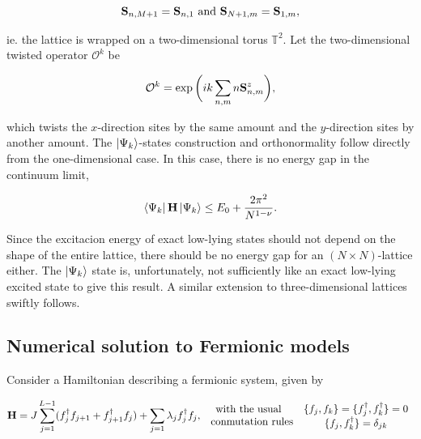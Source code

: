 \documentclass{homework}
\begin{document}
$$
{\bf S}_{n, M+1} = {\bf S}_{n, 1} \textnormal{ and } {\bf S}_{N+1, m} = {\bf S}_{1, m},
$$

ie. the lattice is wrapped on a two-dimensional torus $\mathds{T}^2$. Let the two-dimensional twisted operator  $\mathcal{O}^k$ be 

$$
    \mathcal{O}^k = \exp\bigg(ik \sum_{n, m} n {\bf S}_{n, m}^z \bigg),
$$

which twists the $x$-direction sites by the same amount and the $y$-direction sites by another amount. The $\ket{\Psi_k}$-states construction and orthonormality follow directly from the one-dimensional case. In this case, there is no energy gap in the continuum limit,  

$$
    \bra{\Psi_k} {{\bf H}} \ket{\Psi_k} \leq E_0 + \frac{2\pi^2}{N^{1-\nu}}.
$$

Since the excitacion energy of exact low-lying states should not depend on the shape of the entire lattice, there should be no energy gap for an $(N \times N)$-lattice either. The $\ket{\Psi_k}$ state is, unfortunately, not sufficiently like an exact low-lying excited state to give this result. A similar extension to three-dimensional lattices swiftly follows. \\

\subsection{Numerical solution to Fermionic models}

Consider a Hamiltonian describing a fermionic system, given by 

\begin{equation}
    {\bf H} = J \sum_{j=1}^{L-1} (f_{j}^{\dagger}f_{j+1} + f_{j+1}^{\dagger}f_{j}) + \sum_{j=1} \lambda_j f_{j}^{\dagger} f_j, \begin{array}{c}
         \textnormal{with the usual } \\
         \textnormal{ conmutation rules} 
    \end{array}
    \begin{array}{c}
         \{f_j, f_k\} = \{f_j^\dagger, f_k^\dagger\} = 0  \\
         \{f_j, f_k^\dagger\} = \delta_{jk}
    \end{array}
    \label{fermionic hamiltonian}
\end{equation}
\end{document}
